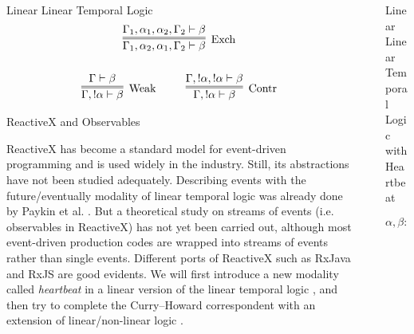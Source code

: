 \documentclass[final]{beamer}
\newlength{\sepwidth}
\newlength{\colwidth}
\newcommand{\separatorcolumn}{\begin{column}{\sepwidth}\end{column}}
\begin{document}
\begin{frame}[t]
\begin{columns}[t]
\begin{column}{\colwidth}
\begin{block}{Linear Linear Temporal Logic}
    \begin{gather*}
    \infer=[\mbox{Exch}]{\Gamma_1, \alpha_2, \alpha_1, \Gamma_2 \vdash \beta}{\Gamma_1, \alpha_1, \alpha_2, \Gamma_2 \vdash \beta}
    \\ \\
    \infer=[\mbox{Weak}]{\Gamma, !\alpha \vdash \beta}{\Gamma \vdash \beta}
    ~~~~ ~~~~
    \infer=[\mbox{Contr}]{\Gamma, !\alpha \vdash \beta}{\Gamma, !\alpha, !\alpha \vdash \beta}
    \end{gather*}

  \end{block}

  \begin{alertblock}{ReactiveX and Observables}

    ReactiveX has become a standard model for event-driven programming and is used widely in the industry. Still, its abstractions have not been studied adequately. 
    Describing events with the future/eventually modality of linear temporal logic was already done by Paykin et al. \cite{Paykin2016TheEO}. But a theoretical study on streams of events (i.e. observables in ReactiveX) has not yet been carried out, although most event-driven production codes are wrapped into streams of events rather than single events. Different ports of ReactiveX such as RxJava and RxJS are good evidents. We will first introduce a new modality called \textit{heartbeat} in a linear version \cite{DBLP:journals/tcs/Girard87} of the linear temporal logic \cite{DBLP:conf/focs/Pnueli77}, and then try to complete the Curry--Howard correspondent \cite{Howard1969TheFN} with an extension of linear/non-linear logic \cite{DBLP:conf/csl/Benton94}.

  \end{alertblock}

\end{column}

\separatorcolumn

\begin{column}{\colwidth}

  \begin{block}{Linear Linear Temporal Logic with Heartbeat}

    
    \[
    \alpha, \beta ::= 0 \mid a \mid \alpha \multimap \beta \mid \alpha \oplus \beta \mid \alpha \otimes \beta \mid~!\alpha \mid \lozenge\alpha \mid \heartsuit\alpha.
    \]
    
    

\end{block}
\end{column}
\end{columns}
\end{frame}
\end{document}
